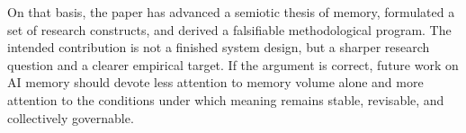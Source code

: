 \documentclass[10pt,twocolumn]{article}
\begin{document}
On that basis, the paper has advanced a semiotic thesis of memory, formulated a set of research constructs, and derived a falsifiable methodological program. The intended contribution is not a finished system design, but a sharper research question and a clearer empirical target. If the argument is correct, future work on AI memory should devote less attention to memory volume alone and more attention to the conditions under which meaning remains stable, revisable, and collectively governable.



\end{document}
